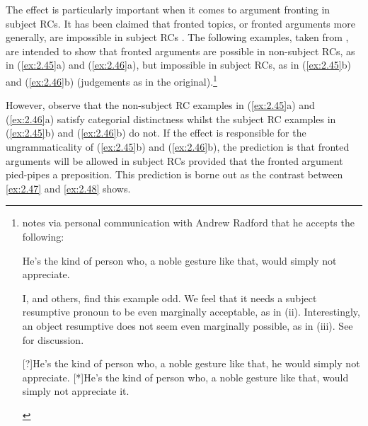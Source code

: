 \documentclass[output=paper]{langsci/langscibook}
\begin{document}
The  effect is particularly important when it comes to
argument fronting in subject \glspl{RC}. It has been claimed that fronted topics, or
fronted arguments more generally, are impossible in subject RCs
\parencites[58]{Haegeman2012}[307]{Rizzi1997}. The following examples, taken
from \textcite[307]{Rizzi1997}, are intended to show that fronted arguments are
possible in non-subject RCs, as in (\ref{ex:2.45}a) and (\ref{ex:2.46}a), but impossible in subject
RCs, as in (\ref{ex:2.45}b) and (\ref{ex:2.46}b) (judgements as in the
original).\footnote{\textcite[Ch.\ 2, note 6]{Haegeman2012} notes via personal
    communication with Andrew Radford that he accepts the following:

    \begin{exe}
          He’s the kind of person who, a noble gesture like that, would simply not appreciate.
    \end{exe}
    I, and others, find this example odd. We feel that it needs a subject
    resumptive pronoun to be even marginally acceptable, as in (ii).
    Interestingly, an object resumptive does not seem even marginally possible,
    as in (iii). See  for discussion.

    \begin{exe}
        [?]{He’s the kind of person who, a noble gesture like that, he would simply not appreciate.}
        [*]{He’s the kind of person who, a noble gesture like that, would simply not appreciate it.}
\end{exe}\label{fn:02.5}}

\ea\label{ex:2.45}
    \z
\ex\label{ex:2.46}
    \z
\z
{}
%
However, observe that the non-subject \gls{RC} examples in (\ref{ex:2.45}a) and (\ref{ex:2.46}a) satisfy
categorial distinctness whilst the subject \gls{RC} examples in (\ref{ex:2.45}b) and (\ref{ex:2.46}b) do
not. If the  effect is responsible for the
ungrammaticality of (\ref{ex:2.45}b) and (\ref{ex:2.46}b), the prediction is that fronted arguments
will be allowed in subject \glspl{RC} provided that the fronted argument pied-pipes a
preposition. This prediction is borne out as the contrast between \eqref{ex:2.47} and \eqref{ex:2.48}
shows.\largerpage[1.5]
\end{document}
